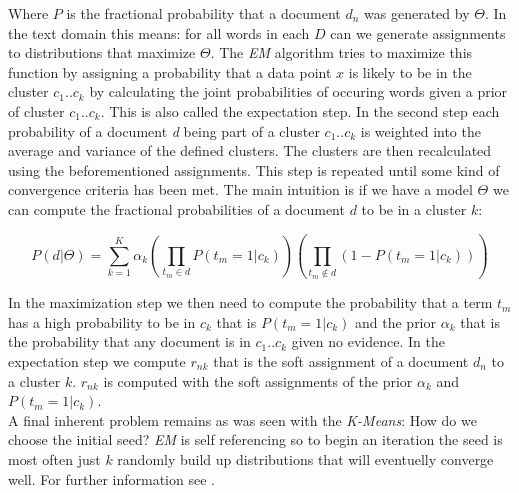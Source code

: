    Where $P$ is the fractional probability that a document $d_n$ was generated by $\Theta$. In the text domain this means: for all words in each $D$ can we generate assignments to distributions that maximize $\Theta$.
    The \emph{EM} algorithm tries to maximize this function by assigning a probability that a data point $x$ is likely to be in the cluster $c_1..c_k$ by calculating the joint probabilities of occuring words given a prior of cluster $c_1..c_k$. This is also called the expectation step. In the second step each probability of a document \emph{d} being part of a cluster $c_1..c_k$ is weighted into the average and variance of the defined clusters. The clusters are then recalculated using the beforementioned assignments. This step is repeated until some kind of convergence criteria has been met. The main intuition is if we have a model $\Theta$ we can compute the fractional probabilities of a document $d$ to be in a cluster $k$:

      \begin{equation}
        P(d|\Theta) = \sum_{k=1}^{K}\alpha_k\left ( \prod_{t_m \in d} P(t_m = 1|c_k) \right ) \left ( \prod_{t_m \not\in d} (1 - P(t_m = 1|c_k)) \right )
      \end{equation}

    In the maximization step we then need to compute the probability that a term $t_m$ has a high probability to be in $c_k$ that is $P(t_m = 1|c_k)$ and the prior $\alpha_k$ that is the probability that any document is in $c_1..c_k$ given no evidence. In the expectation step we compute $r_{nk}$ that is the soft assignment of a document $d_n$ to a cluster $k$. $r_{nk}$ is computed with the soft assignments of the prior $\alpha_k$ and $P(t_m = 1|c_k)$.\\
    A final inherent problem remains as was seen with the \emph{K-Means}: How do we choose the initial seed? \emph{EM} is self referencing so to begin an iteration the seed is most often just $k$ randomly build up distributions that will eventuelly converge well. For further information see \cite{IRBookStanford2008}.

